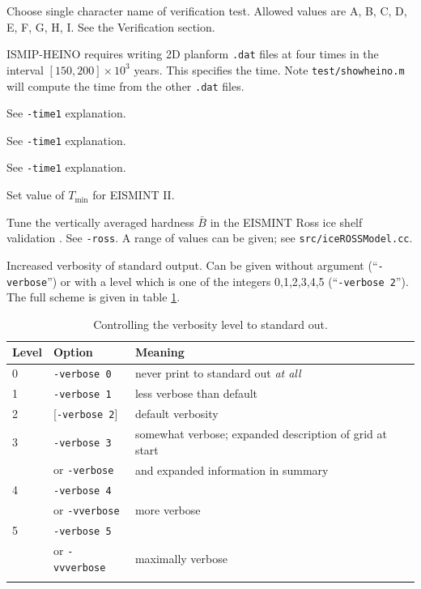 \documentclass[12pt,final]{amsart}
\renewcommand{\t}[1]{\texttt{#1}}
\begin{document}
  Choose single character name of verification test.  Allowed values are A, B, C, D, E, F, G, H, I.  See the Verification section.

  ISMIP-HEINO requires writing 2D planform \verb|.dat| files at four times in the interval $[150,200]\times 10^{3}$ years.  This specifies the time.  Note \verb|test/showheino.m| will compute the time from the other \verb|.dat| files.

  See \verb|-time1| explanation.

  See \verb|-time1| explanation.

  See \verb|-time1| explanation.

    Set value of $T_{\text{min}}$ for EISMINT II.

    Tune the vertically averaged hardness $\bar B$ in the EISMINT Ross ice shelf validation \cite{MacAyealetal}.  See \verb|-ross|.  A range of values can be given; see \verb|src/iceROSSModel.cc|.

   Increased verbosity of standard output.  Can be given without argument (``\verb|-verbose|'') or with a level which is one of the integers 0,1,2,3,4,5 (``\verb|-verbose 2|'').  The full scheme is given in table \ref{tab:verbosity}.

\begin{table}[h]
\caption{Controlling the verbosity level to standard out.}\label{tab:verbosity}
\begin{tabular}{@{}llll}\hline
\textbf{Level} & \textbf{Option} & \textbf{Meaning} \\ \hline
   0  &  \t{-verbose 0} &   never print to standard out \emph{at all}  \\
   1  &  \t{-verbose 1} &   less verbose than default  \\
   2  &  [\t{-verbose 2}] & default verbosity    \\
   3  &  \t{-verbose 3} &   somewhat verbose; expanded description of grid at start  \\
      &  or \quad \t{-verbose} &  and expanded information in summary    \\
   4  &  \t{-verbose 4} &     \\
      &  or \quad \t{-vverbose} &  more verbose    \\
   5  &  \t{-verbose 5} &     \\
      &  or \quad \t{-vvverbose} &  maximally verbose \\
\hline
\normalsize
\end{tabular}
\end{table}
\end{document}
